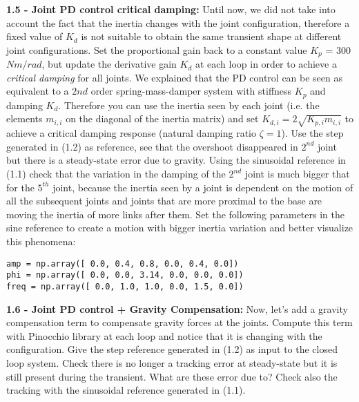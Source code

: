 \documentclass[11pt]{article}
\begin{document}
\quad

\noindent
\textbf{1.5 - Joint PD control critical damping:}
Until now, we did not take into account the fact that the inertia changes with the joint configuration, therefore a fixed value of $K_d$ is not suitable to obtain 
the same transient shape at different joint configurations. Set the proportional gain back to a constant value $K_p$ = 300 $Nm/rad$, but update the derivative gain 
$K_d$ at each loop in order to achieve a \textit{critical damping} for all  joints. We explained that the PD control can be seen as equivalent to a $2{nd}$ order 
spring-mass-damper system with stiffness $K_p$ and damping $K_d$. 
Therefore you can use the inertia seen by each joint (i.e. the elements $m_{i,i}$ on the diagonal 
of the inertia matrix) and set $K_{d,i} = 2\sqrt{K_{p,i} m_{i,i}}$ to achieve a critical damping response (natural damping ratio $\zeta = 1$). Use the step 
generated in (1.2) as reference, see that the overshoot disappeared in $2^{nd}$ joint but there is a steady-state error due to gravity. Using the sinusoidal 
reference in (1.1) %
check that the variation in the damping of the $2^{nd}$ joint is much bigger that for the $5^{th}$ joint, because the inertia seen by a joint  is dependent on the motion of all the subsequent joints and joints that are more proximal to the base are moving the inertia of more links after them.
Set the following parameters in the sine reference to create a motion with bigger inertia variation and better visualize this phenomena:


\begin{verbatim}
amp = np.array([ 0.0, 0.4, 0.8, 0.0, 0.4, 0.0])    
phi = np.array([ 0.0, 0.0, 3.14, 0.0, 0.0, 0.0])      
freq = np.array([ 0.0, 1.0, 1.0, 0.0, 1.5, 0.0])    
\end{verbatim}


\quad

\noindent
\textbf{1.6 - Joint PD control + Gravity Compensation:}
Now, let's add a gravity compensation term to compensate gravity forces at the joints. 
Compute this term with Pinocchio library at each loop and notice that it is changing with the configuration. 
Give the step reference generated in (1.2) as input to the closed loop system. 
Check there is no longer a  tracking error at steady-state but it is still present during the transient. What are these error due to?
Check also the tracking with the sinusoidal reference generated in (1.1).

\quad
\end{document}
